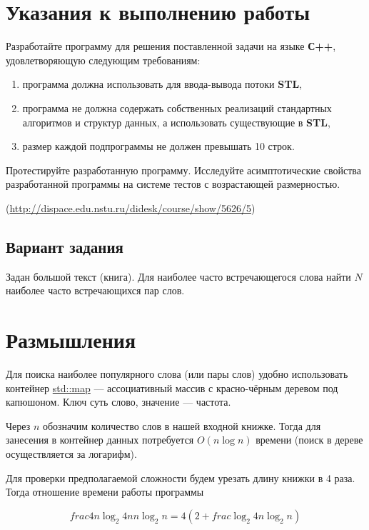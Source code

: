 
\section{Указания к выполнению работы}

Разработайте программу для решения поставленной задачи на языке \textbf{С++}, удовлетворяющую следующим требованиям:

\begin{enumerate}
	\item программа должна использовать для ввода-вывода потоки \textbf{STL},
	\item программа не должна содержать собственных реализаций стандартных алгоритмов и структур данных, а использовать существующие в \textbf{STL},
	\item размер каждой подпрограммы не должен превышать 10 строк.
\end{enumerate}

Протестируйте разработанную программу. Исследуйте асимптотические свойства разработанной программы на системе тестов с возрастающей размерностью.

(\url{http://dispace.edu.nstu.ru/didesk/course/show/5626/5})

\subsection{Вариант задания}

Задан большой текст (книга). Для наиболее часто встречающегося слова найти $N$ наиболее часто встречающихся пар слов.

\section{Размышления}

Для поиска наиболее популярного слова (или пары слов) удобно использовать контейнер \href{http://en.cppreference.com/w/cpp/container/map}{std::map} --- ассоциативный массив с красно-чёрным деревом под капюшоном. Ключ суть слово, значение --- частота.

Через $n$ обозначим количество слов в нашей входной книжке. Тогда для занесения в контейнер данных потребуется $O(n \log n)$ времени (поиск в дереве осуществляется за логарифм). 

Для проверки предполагаемой сложности будем урезать длину книжки в 4 раза. Тогда отношение времени работы программы

\begin{equation}
\label{complexity}
	frac{4n \log_2 4n}{n \log_2 n} = 4 ( 2 + frac{\log_2 4n}{\log_2 n})
\end{equation}
